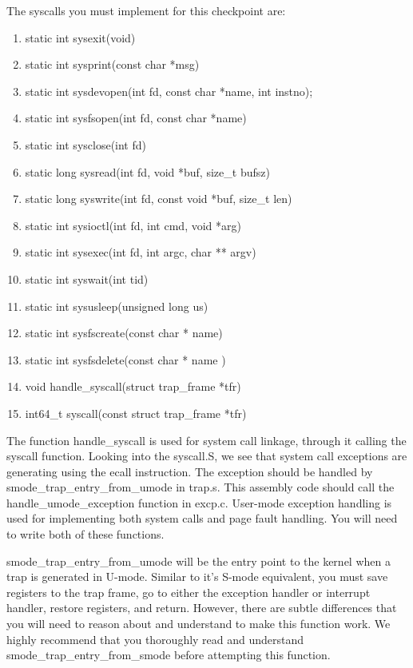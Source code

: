 \documentclass{article}
\begin{document}
        The syscalls you must implement for this checkpoint are:
        
		\begin{enumerate}
			\item{\fix static int sysexit(void)}
			\item{\fix static int sysprint(const char *msg)}
			\item{\fix static int sysdevopen(int fd, const char *name, int instno);}
			\item{\fix static int sysfsopen(int fd, const char *name)}
			\item{\fix static int sysclose(int fd)}
			\item{\fix static long sysread(int fd, void *buf, size\_t bufsz)}		
			\item{\fix static long syswrite(int fd, const void *buf, size\_t len)}
			\item{\fix static int sysioctl(int fd, int cmd, void *arg)}
			\item{\fix static int sysexec(int fd, int argc, char ** argv)}
			\item{\fix static int syswait(int tid)}
			\item{\fix static int sysusleep(unsigned long us)}
			\item{\fix static int sysfscreate(const char * name)} 
			\item {\fix static int sysfsdelete(const char * name )}
			\item{\fix void handle\_syscall(struct trap\_frame *tfr)}
			\item {\fix int64\_t syscall(const struct trap\_frame *tfr)}
			
		\end{enumerate}

		The function {\fix handle\_syscall} is used for system call linkage, through it calling the {\fix syscall} function. 
		Looking into the {\fix syscall.S}, we see that system call exceptions are generating using the {\fix ecall} instruction.
		The exception should be handled by {\fix smode\_trap\_entry\_from\_umode} in {\fix trap.s}. This assembly code should call the 
		{\fix handle\_umode\_exception} function in {\fix excp.c}. User-mode exception handling is used for implementing both system calls and page fault handling.
		You will need to write both of these functions.

		{\fix smode\_trap\_entry\_from\_umode} will be the entry point to the kernel when a trap is generated in U-mode. Similar to it's S-mode equivalent,
		you must save registers to the trap frame, go to either the exception handler or interrupt handler, restore registers, and return.
		However, there are subtle differences that you will need to reason about and understand to make this function work.
		We highly recommend that you thoroughly read and understand {\fix smode\_trap\_entry\_from\_smode} before attempting this function.
\end{document}
